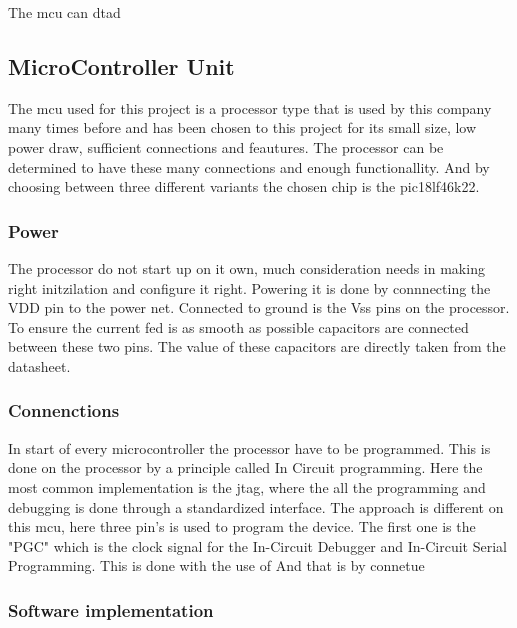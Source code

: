
The \gls{mcu} can dtad

\subsection{MicroController Unit}
The \gls{mcu} used for this project is a processor type that is used by this company many times before and has been chosen to this project for its small size, low power draw, sufficient connections and feautures. The processor can be determined to have these many connections and enough functionallity. And by choosing between three different variants the chosen chip is the pic18lf46k22\cite{pic18}.
\subsubsection{Power}

The processor do not start up on it own, much consideration needs in making right initzilation and configure it right. Powering it is done by connnecting the VDD pin to the power net. Connected to ground is the Vss pins on the processor. To ensure the current fed is as smooth as possible capacitors are connected between these two pins. The value of these capacitors are directly taken from the datasheet.

\subsubsection{Connenctions}
In start of every microcontroller the processor have to be programmed. This is done on the processor by a principle called In Circuit programming\cite{}. Here the most common implementation is the \gls{jtag}, where the all the programming and debugging is done through a standardized interface. The approach is different on this \gls{mcu}, here three pin's is used to program the device. The first one is the "PGC" which is the clock signal for the In-Circuit Debugger and In-Circuit Serial Programming. This is done with the use of 
And that is by connetue

\subsubsection{Software implementation}

